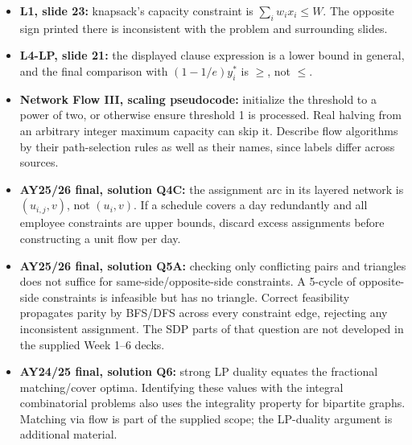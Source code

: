 \documentclass[10pt]{article}
\theoremstyle{definition}
\begin{document}
\begin{itemize}
\item \textbf{L1, slide 23:} knapsack's capacity constraint is $\sum_i w_ix_i\le W$.
The opposite sign printed there is inconsistent with the problem and surrounding slides.
\item \textbf{L4-LP, slide 21:} the displayed clause expression is a lower bound in
general, and the final comparison with $(1-1/e)y_i^*$ is $\ge$, not $\le$.
\item \textbf{Network Flow III, scaling pseudocode:} initialize the threshold to a power
of two, or otherwise ensure threshold 1 is processed. Real halving from an arbitrary
integer maximum capacity can skip it. Describe flow algorithms by their path-selection
rules as well as their names, since labels differ across sources.
\item \textbf{AY25/26 final, solution Q4C:} the assignment arc in its layered network
is $(u_{i,j},v)$, not $(u_i,v)$. If a schedule covers a day redundantly and all employee
constraints are upper bounds, discard excess assignments before constructing a unit
flow per day.
\item \textbf{AY25/26 final, solution Q5A:} checking only conflicting pairs and triangles
does not suffice for same-side/opposite-side constraints. A 5-cycle of opposite-side
constraints is infeasible but has no triangle. Correct feasibility propagates parity by
BFS/DFS across every constraint edge, rejecting any inconsistent assignment. The SDP
parts of that question are not developed in the supplied Week 1--6 decks.
\item \textbf{AY24/25 final, solution Q6:} strong LP duality equates the fractional
matching/cover optima. Identifying these values with the integral combinatorial problems
also uses the integrality property for bipartite graphs. Matching via flow is part of the
supplied scope; the LP-duality argument is additional material.
\end{itemize}
\end{document}
